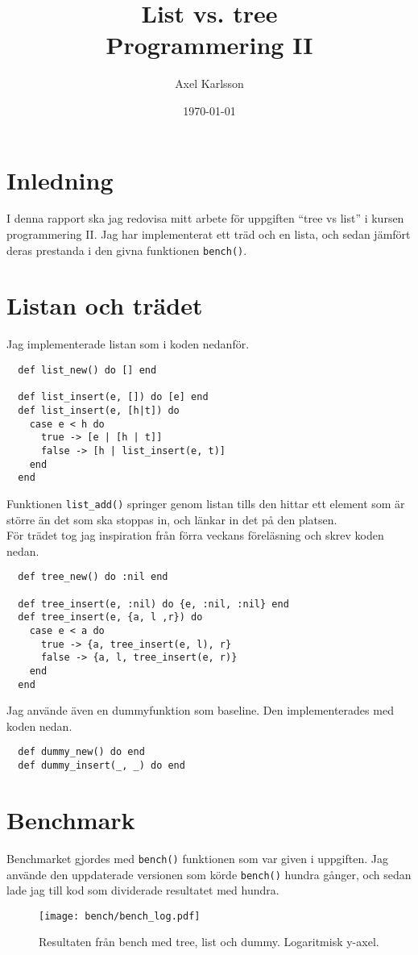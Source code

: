 \documentclass[a4paper,11pt]{article}
\begin{document}
\title{
  \textbf{List vs. tree\\
  \small Programmering II}
}
\author{Axel Karlsson}
\date{\today}

\maketitle

\section*{Inledning}
I denna rapport ska jag redovisa mitt arbete för uppgiften ``tree vs list'' i kursen programmering II. Jag har implementerat ett träd och en lista, och sedan jämfört deras prestanda i den givna funktionen {\tt bench()}.

\section*{Listan och trädet}
Jag implementerade listan som i koden nedanför.
\begin{verbatim}
  def list_new() do [] end
  
  def list_insert(e, []) do [e] end
  def list_insert(e, [h|t]) do
    case e < h do
      true -> [e | [h | t]]
      false -> [h | list_insert(e, t)]
    end
  end
\end{verbatim}
Funktionen {\tt list\_add()} springer genom listan tills den hittar ett element som är större än det som ska stoppas in, och länkar in det på den platsen.\\
För trädet tog jag inspiration från förra veckans föreläsning och skrev koden nedan.
\begin{verbatim}
  def tree_new() do :nil end

  def tree_insert(e, :nil) do {e, :nil, :nil} end
  def tree_insert(e, {a, l ,r}) do
    case e < a do
      true -> {a, tree_insert(e, l), r}
      false -> {a, l, tree_insert(e, r)}
    end
  end
\end{verbatim}
Jag använde även en dummyfunktion som baseline. Den implementerades med koden nedan.
\begin{verbatim}
  def dummy_new() do end
  def dummy_insert(_, _) do end
\end{verbatim}

\section*{Benchmark}
Benchmarket gjordes med {\tt bench()} funktionen som var given i uppgiften. Jag använde den uppdaterade versionen som körde {\tt bench()} hundra gånger, och sedan lade jag till kod som dividerade resultatet med hundra.
\begin{figure}[H]
  \center
  \texttt{[image: bench/bench\_log.pdf]}
  \caption{Resultaten från bench med tree, list och dummy. Logaritmisk y-axel.}
  \label{bench_log}
\end{figure}
\end{document}
